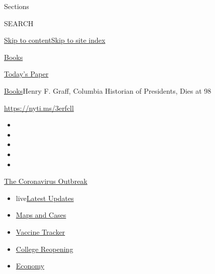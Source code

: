 Sections

SEARCH

\protect\hyperlink{site-content}{Skip to
content}\protect\hyperlink{site-index}{Skip to site index}

\href{https://www.nytimes3xbfgragh.onion/section/books}{Books}

\href{https://myaccount.nytimes3xbfgragh.onion/auth/login?response_type=cookie\&client_id=vi}{}

\href{https://www.nytimes3xbfgragh.onion/section/todayspaper}{Today's
Paper}

\href{/section/books}{Books}\textbar{}Henry F. Graff, Columbia Historian
of Presidents, Dies at 98

\url{https://nyti.ms/3erfcll}

\begin{itemize}
\item
\item
\item
\item
\item
\end{itemize}

\href{https://www.nytimes3xbfgragh.onion/news-event/coronavirus?action=click\&pgtype=Article\&state=default\&region=TOP_BANNER\&context=storylines_menu}{The
Coronavirus Outbreak}

\begin{itemize}
\tightlist
\item
  live\href{https://www.nytimes3xbfgragh.onion/2020/08/04/world/coronavirus-covid-19.html?action=click\&pgtype=Article\&state=default\&region=TOP_BANNER\&context=storylines_menu}{Latest
  Updates}
\item
  \href{https://www.nytimes3xbfgragh.onion/interactive/2020/us/coronavirus-us-cases.html?action=click\&pgtype=Article\&state=default\&region=TOP_BANNER\&context=storylines_menu}{Maps
  and Cases}
\item
  \href{https://www.nytimes3xbfgragh.onion/interactive/2020/science/coronavirus-vaccine-tracker.html?action=click\&pgtype=Article\&state=default\&region=TOP_BANNER\&context=storylines_menu}{Vaccine
  Tracker}
\item
  \href{https://www.nytimes3xbfgragh.onion/2020/08/02/us/covid-college-reopening.html?action=click\&pgtype=Article\&state=default\&region=TOP_BANNER\&context=storylines_menu}{College
  Reopening}
\item
  \href{https://www.nytimes3xbfgragh.onion/live/2020/08/03/business/stock-market-today-coronavirus?action=click\&pgtype=Article\&state=default\&region=TOP_BANNER\&context=storylines_menu}{Economy}
\end{itemize}

